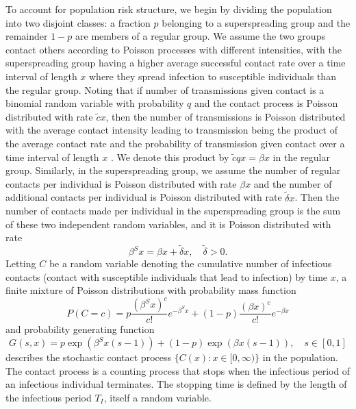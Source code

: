 \documentclass{imammb}
\numberwithin{equation}{section}
\begin{document}
To account for population risk structure, we begin by dividing the population into two disjoint classes: a fraction $p$ belonging to a superspreading group and the remainder $1-p$ are members of a regular group. We assume the two groups contact others according to Poisson processes with different intensities, with the superspreading group having a higher average successful contact rate over a time interval of length $x$ where they spread infection to susceptible individuals than the regular group. Noting that if number of transmissions given contact is a binomial random variable with probability $q$ and the contact process is Poisson distributed with rate $\tilde{c} x$, then the number of transmissions is Poisson distributed with the average contact intensity leading to transmission being the product of the average contact rate and the probability of transmission given contact over a time interval of length $x$ \citep{Diekmann2013-zu}. We denote this product by $\tilde{c} q x = \beta x$ in the regular group. Similarly, in the superspreading group, we assume the number of regular contacts per individual is Poisson distributed with rate $\beta x$ and the number of additional contacts per individual is Poisson distributed with rate $\tilde{\delta} x$. Then the number of contacts made per individual in the superspreading group is the sum of these two independent random variables, and it is Poisson distributed with rate
\begin{equation}\label{eqn:R0Adel}
   \beta^S x= \beta x +\tilde{\delta} x, \quad \tilde{\delta} >0.  
\end{equation}
Letting $C$ be a random variable denoting the cumulative number of infectious contacts (contact with susceptible individuals that lead to infection) by time $x$,  a finite mixture of Poisson distributions with probability mass function %
\begin{equation}\label{eqn:contactpmf}
  P(C=c)=  p \frac{(\beta^S x)^c}{c!} e^{-\beta^S x} +(1-p)\frac{(\beta x)^c }{c!} e^{-\beta x}
\end{equation}
and probability generating function
\begin{equation}\label{eqn:contactpgf}
    G(s,x) = p \exp \left ( \beta^S x (s-1) \right)  + (1-p) \exp  \left (\beta x (s-1)\right), \quad s \in [0,1]
\end{equation}
describes the stochastic contact process $\{C(x): x \in [0, \infty)\}$ in the population. The contact process is a counting process that stops when the infectious period of an infectious individual terminates. The stopping time is defined by the length of the infectious period $T_I$, itself a random variable.
\end{document}
